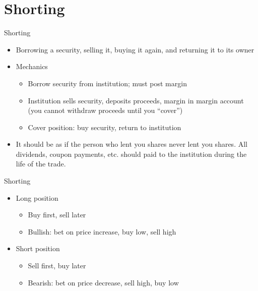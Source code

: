 \documentclass{beamer}
\begin{document}
\section{Shorting}
\begin{frame}{Shorting}
\begin{itemize}
\item Borrowing a security, selling it, buying it again, and returning it to its owner
\item Mechanics
\begin{itemize}
\item Borrow security from institution; must post margin
\item Institution sells security, deposits proceeds, margin in margin account (you cannot withdraw proceeds until you ``cover'')
\item Cover position: buy security, return to institution 
\end{itemize}
\item It should be as if the person who lent you shares never lent you shares. All dividends, coupon payments, etc. should paid to the institution during the life of the trade.
\end{itemize}
\end{frame}

\begin{frame}{Shorting}
\begin{itemize}
\item Long position
\begin{itemize}
\item Buy first, sell later
\item Bullish: bet on price increase, buy low, sell high
\end{itemize}
\item Short position
\begin{itemize}
\item Sell first, buy later
\item Bearish: bet on price decrease, sell high, buy low
\end{itemize}
\end{itemize}
\end{frame}
\end{document}
